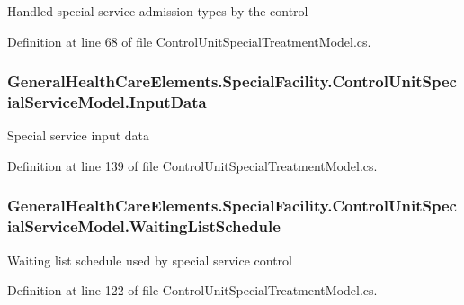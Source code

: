 Handled special service admission types by the control 



Definition at line 68 of file Control\+Unit\+Special\+Treatment\+Model.\+cs.

\subsubsection[{\texorpdfstring{Input\+Data}{InputData}}]{ General\+Health\+Care\+Elements.\+Special\+Facility.\+Control\+Unit\+Special\+Service\+Model.\+Input\+Data\hspace{0.3cm}{\ttfamily [get]}}\hypertarget{class_general_health_care_elements_1_1_special_facility_1_1_control_unit_special_service_model_a97bea95bfd2ef003c88b97c71d344468}{}\label{class_general_health_care_elements_1_1_special_facility_1_1_control_unit_special_service_model_a97bea95bfd2ef003c88b97c71d344468}


Special service input data 



Definition at line 139 of file Control\+Unit\+Special\+Treatment\+Model.\+cs.

\subsubsection[{\texorpdfstring{Waiting\+List\+Schedule}{WaitingListSchedule}}]{ General\+Health\+Care\+Elements.\+Special\+Facility.\+Control\+Unit\+Special\+Service\+Model.\+Waiting\+List\+Schedule\hspace{0.3cm}{\ttfamily [get]}}\hypertarget{class_general_health_care_elements_1_1_special_facility_1_1_control_unit_special_service_model_a9dd3b95fa748793c37ae5fe94ce5819f}{}\label{class_general_health_care_elements_1_1_special_facility_1_1_control_unit_special_service_model_a9dd3b95fa748793c37ae5fe94ce5819f}


Waiting list schedule used by special service control 



Definition at line 122 of file Control\+Unit\+Special\+Treatment\+Model.\+cs.

